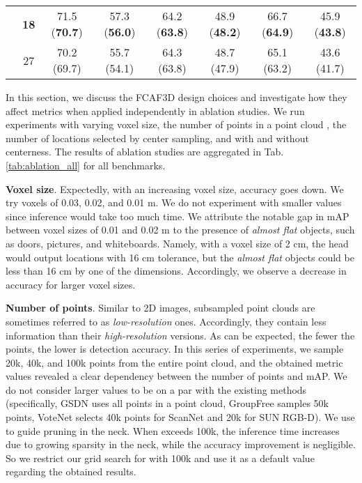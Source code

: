 \documentclass[runningheads]{llncs}
\begin{document}
\begin{table*}[ht!]
{\begin{tabular}{c|c|cccccc}
    & \textbf{18} & 71.5 (\textbf{70.7}) & 57.3 (\textbf{56.0}) & 64.2 (\textbf{63.8}) & 48.9 (\textbf{48.2}) & 66.7 (\textbf{64.9}) & 45.9 (\textbf{43.8}) \\
    & 27 & 70.2 (69.7) & 55.7 (54.1) & 64.3 (63.8) & 48.7 (47.9) & 65.1 (63.2) & 43.6 (41.7) \\ \hline
    \end{tabular}
    }
    \caption{Results of ablation studies on the voxel size, the number of points (which equals the number of voxels  in pruning), centerness, and center sampling in FCAF3D. The better options are marked bold (actually, these are the default options used to obtain the results in Tab. \ref{tab:results} above). The reported metric value is the best across 25 trials; the average value is given in brackets.}
    \label{tab:ablation_all}
\end{table*}

In this section, we discuss the FCAF3D design choices and investigate how they affect metrics when applied independently in ablation studies. We run experiments with varying voxel size, the number of points in a point cloud , the number of locations selected by center sampling, and with and without centerness. The results of ablation studies are aggregated in Tab. \ref{tab:ablation_all} for all benchmarks.

\textbf{Voxel size}. Expectedly, with an increasing voxel size, accuracy goes down. We try voxels of 0.03, 0.02, and 0.01 m. We do not experiment with smaller values since inference would take too much time. We attribute the notable gap in mAP between voxel sizes of 0.01 and 0.02 m to the presence of \textit{almost flat} objects, such as doors, pictures, and whiteboards. Namely, with a voxel size of 2 cm, the head would output locations with 16 cm tolerance, but the \textit{almost flat} objects could be less than 16 cm by one of the dimensions. Accordingly, we observe a decrease in accuracy for larger voxel sizes.

\textbf{Number of points}. Similar to 2D images, subsampled point clouds are sometimes referred to as \textit{low-resolution} ones. Accordingly, they contain less information than their \textit{high-resolution} versions. As can be expected, the fewer the points, the lower is detection accuracy. In this series of experiments, we sample 20k, 40k, and 100k points from the entire point cloud, and the obtained metric values revealed a clear dependency between the number of points and mAP. We do not consider larger  values to be on a par with the existing methods (specifically, GSDN \cite{gwak2020gsdn} uses all points in a point cloud, GroupFree \cite{liu2021group-free} samples 50k points, VoteNet \cite{qi2019votenet} selects 40k points for ScanNet and 20k for SUN RGB-D). We use  to guide pruning in the neck. When  exceeds 100k, the inference time increases due to growing sparsity in the neck, while the accuracy improvement is negligible. So we restrict our grid search for  with 100k and use it as a default value regarding the obtained results.
\end{document}
